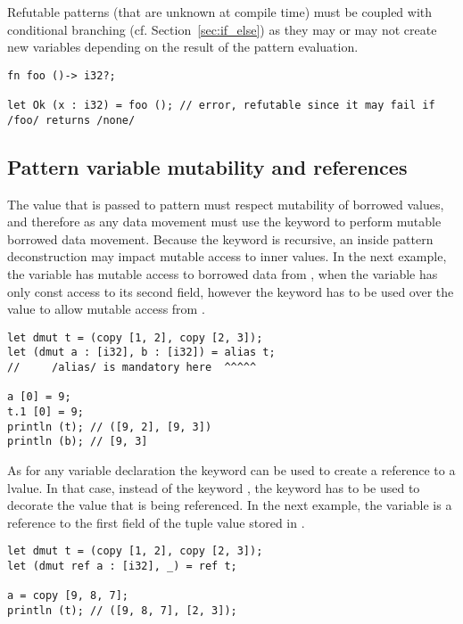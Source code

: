 Refutable patterns (that are unknown at compile time) must be coupled with
conditional branching (cf. Section~\ref{sec:if_else}) as they may or may not
create new variables depending on the result of the pattern evaluation.

\begin{lstlisting}[style=coloredverbatim]
fn foo ()-> i32?;

let Ok (x : i32) = foo (); // error, refutable since it may fail if /foo/ returns /none/
\end{lstlisting}

\subsection{Pattern variable mutability and references}

The value that is passed to pattern must respect mutability of borrowed values,
and therefore as any data movement must use the keyword  to
perform mutable borrowed data movement. Because the keyword is recursive, an
inside pattern deconstruction may impact mutable access to inner values. In the
next example, the variable  has mutable access to borrowed data from
, when the variable  has only const access to its second
field, however the keyword  has to be used over the value
 to allow mutable access from .

\begin{lstlisting}[style=coloredverbatim]
let dmut t = (copy [1, 2], copy [2, 3]);
let (dmut a : [i32], b : [i32]) = alias t;
//     /alias/ is mandatory here  ^^^^^

a [0] = 9;
t.1 [0] = 9;
println (t); // ([9, 2], [9, 3])
println (b); // [9, 3]
\end{lstlisting}

As for any variable declaration the keyword  can be used to create a
reference to a lvalue. In that case, instead of the keyword \token{alias}, the
keyword \token{ref} has to be used to decorate the value that is being
referenced. In the next example, the variable \token{a} is a reference to the
first field of the tuple value stored in \token{t}.

\begin{lstlisting}[style=coloredverbatim]
let dmut t = (copy [1, 2], copy [2, 3]);
let (dmut ref a : [i32], _) = ref t;

a = copy [9, 8, 7];
println (t); // ([9, 8, 7], [2, 3]);
\end{lstlisting}

